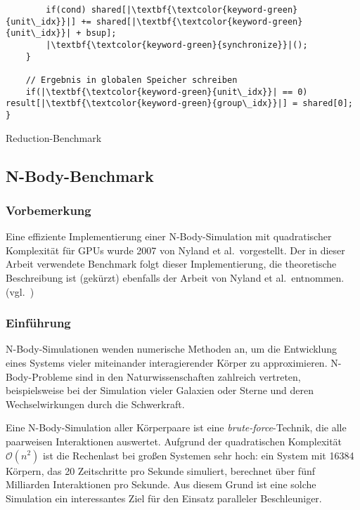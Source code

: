 \begin{code}
\begin{verbatim}
        if(cond) shared[|\textbf{\textcolor{keyword-green}{unit\_idx}}|] += shared[|\textbf{\textcolor{keyword-green}{unit\_idx}}| + bsup];
        |\textbf{\textcolor{keyword-green}{synchronize}}|();
    }
    
    // Ergebnis in globalen Speicher schreiben
    if(|\textbf{\textcolor{keyword-green}{unit\_idx}}| == 0) result[|\textbf{\textcolor{keyword-green}{group\_idx}}|] = shared[0];
}
    \end{verbatim}
    \caption{Reduction-Benchmark}
    \label{methoden:reduction:code}
\end{code}

\subsection{N-Body-Benchmark}
\label{methoden:nbody}

\subsubsection{Vorbemerkung}
\label{methoden:nbody:vorbemerkung}

Eine effiziente Implementierung einer N-Body-Simulation mit quadratischer
Komplexität für GPUs wurde 2007 von Nyland et al.\ vorgestellt. Der in dieser
Arbeit verwendete Benchmark folgt dieser Implementierung, die theoretische
Beschreibung ist (gekürzt) ebenfalls der Arbeit von Nyland et al.\ entnommen.
(vgl.~\cite{nguyen2007})

\subsubsection{Einführung}
\label{methoden:nbody:einfuehrung}

N-Body-Simulationen wenden numerische Methoden an, um die Entwicklung eines
Systems vieler miteinander interagierender Körper zu approximieren.
N-Body-Probleme sind in den Naturwissenschaften zahlreich vertreten,
beispielsweise bei der Simulation vieler Galaxien oder Sterne und deren
Wechselwirkungen durch die Schwerkraft.

Eine N-Body-Simulation aller Körperpaare ist eine \textit{brute-force}-Technik,
die alle paarweisen Interaktionen auswertet. Aufgrund der quadratischen
Komplexität $\mathcal{O}(n^2)$ ist die Rechenlast bei großen Systemen sehr hoch:
ein System mit \num{16384} Körpern, das 20 Zeitschritte pro Sekunde simuliert,
berechnet über fünf Milliarden Interaktionen pro Sekunde. Aus diesem Grund ist
eine solche Simulation ein interessantes Ziel für den Einsatz paralleler
Beschleuniger.

